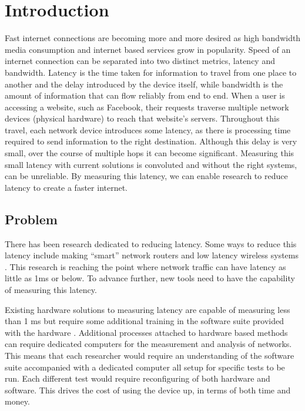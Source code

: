 \chapter{Introduction}\label{C:intro}

\par Fast internet connections are becoming more and more desired as high bandwidth media consumption and internet 
based services grow in popularity. Speed of an internet connection can be separated into two distinct metrics, 
latency and bandwidth. Latency is the time taken for information to travel from one place to another and the delay 
introduced by the device itself, while bandwidth is the amount of information that can flow reliably from end to end.
When a user is accessing a website, such as Facebook, their requests traverse multiple network devices (physical 
hardware) to reach that website's servers. Throughout this travel, each network device introduces some latency, as 
there is processing time required to send information to the right destination. Although this delay is very small, 
over the course of multiple hops it can become significant. Measuring this small latency with current solutions is
convoluted and without the right systems, can be unreliable. By measuring this latency, we can enable research to
reduce latency to create a faster internet.

\section{Problem}

\par There has been research dedicated to reducing latency. Some ways to reduce this latency include making “smart” network routers \cite{smartrouters} and low latency wireless systems \cite{5g}. 
This research is reaching the point where network traffic can have latency as little as 1ms \cite{lessthan1ms} or below.
To advance further, new tools need to have the capability of measuring this latency.

\par Existing hardware solutions to measuring latency are capable of measuring less than 1 ms but require some 
additional training in the software suite provided with the hardware \cite{dagfeatures}. Additional processes attached
to hardware based methods can require dedicated computers for the measurement and analysis of networks. This means 
that each researcher would require an understanding of the software suite accompanied with a dedicated computer 
all setup for specific tests to be run. Each different test would require reconfiguring of both hardware and software.
This drives the cost of using the device up, in terms of both time and money.

